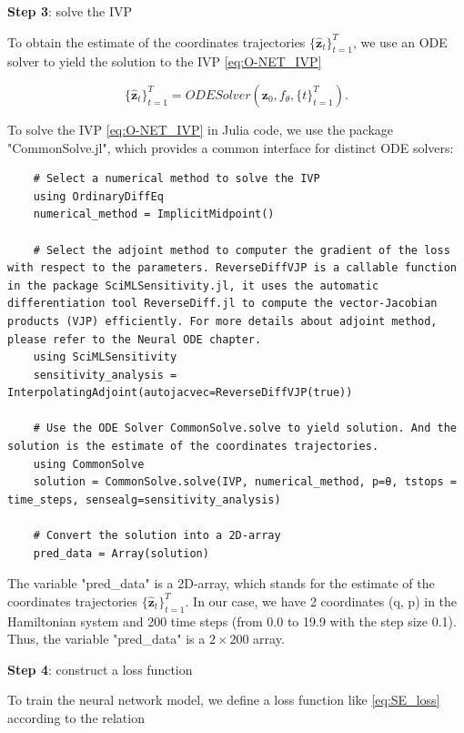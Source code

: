 \documentclass[
	parskip, 			   %
	twoside, 			   %
	DIV=14, 			   %
	BCOR=15.0mm, 		   %
	headsepline, 		   %
	open=right, 		   %
	captions=tableheading, %
	bibliography=totoc,    %
	numbers=noenddot       %
]{scrreprt}
\begin{document}
\textbf{Step 3}: solve the IVP

To obtain the estimate of the coordinates trajectories $\{ \mathbf{\hat{z}}_{t} \}_{t=1}^{T}$, we use an ODE solver to yield the solution to the IVP \ref{eq:O-NET_IVP}

\begin{equation}
    \label{eq:O-NET_ODESolver}
    \{ \mathbf{\hat{z}}_{t} \}_{t=1}^{T} = ODESolver(\mathbf{z}_{0}, f_{\theta}, \{ t \}_{t=1}^{T}).
\end{equation}

To solve the IVP \ref{eq:O-NET_IVP} in Julia code, we use the package "CommonSolve.jl", which provides a common interface for distinct ODE solvers:

\begin{verbatim}
    # Select a numerical method to solve the IVP
    using OrdinaryDiffEq
    numerical_method = ImplicitMidpoint()
    
    # Select the adjoint method to computer the gradient of the loss with respect to the parameters. ReverseDiffVJP is a callable function in the package SciMLSensitivity.jl, it uses the automatic differentiation tool ReverseDiff.jl to compute the vector-Jacobian products (VJP) efficiently. For more details about adjoint method, please refer to the Neural ODE chapter.
    using SciMLSensitivity
    sensitivity_analysis = InterpolatingAdjoint(autojacvec=ReverseDiffVJP(true))
    
    # Use the ODE Solver CommonSolve.solve to yield solution. And the solution is the estimate of the coordinates trajectories.
    using CommonSolve
    solution = CommonSolve.solve(IVP, numerical_method, p=θ, tstops = time_steps, sensealg=sensitivity_analysis)
    
    # Convert the solution into a 2D-array
    pred_data = Array(solution)
\end{verbatim}

The variable "pred\_data" is a 2D-array, which stands for the estimate of the coordinates trajectories $\{ \mathbf{\hat{z}}_{t} \}_{t=1}^{T}$. In our case, we have 2 coordinates (q, p) in the Hamiltonian system and 200 time steps (from 0.0 to 19.9 with the step size 0.1). Thus, the variable "pred\_data" is a $2 \times 200$ array.

\textbf{Step 4}: construct a loss function

To train the neural network model, we define a loss function like \ref{eq:SE_loss} according to the relation
\end{document}
